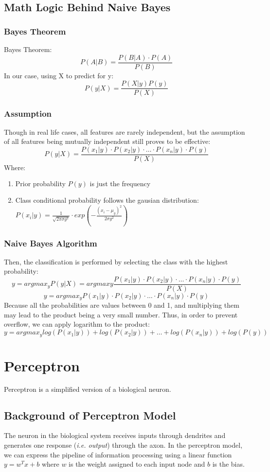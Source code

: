 \documentclass[12pt]{article}
\begin{document}
\subsection{Math Logic Behind Naive Bayes}
\subsubsection{Bayes Theorem}
Bayes Theorem:
$$P(A|B) = \frac{P(B|A)\cdot P(A)}{P(B)}$$
In our case, using X to predict for y:
$$P(y|X) = \frac{P(X|y)P(y)}{P(X)}$$
\subsubsection{Assumption}
Though in real life cases, all features are rarely independent, but the assumption of all features being mutually independent still proves to be effective:
$$P(y|X) = \frac{P(x_1|y)\cdot P(x_2|y)\cdot \dots \cdot P(x_n|y)\cdot P(y)}{P(X)}$$
Where:
\begin{enumerate}
	\item Prior probability $P(y)$ is just the frequency
	\item Class conditional probability follows the gausian distribution: $P(x_i|y) = \frac{1}{\sqrt{2\pi \sigma  y^2}}\cdot
exp(-\frac{(x_i - \mu_y)^2}{2\sigma  y^2})$
\end{enumerate}
\subsubsection{Naive Bayes Algorithm}
Then, the classification is performed by selecting the class with the highest probability:
$$y = argmax_yP(y|X) = argmax  y\frac{P(x_1|y)\cdot P(x_2|y)\cdot \dots \cdot P(x_n|y)\cdot P(y)}{P(X)}$$
$$y = argmax_yP(x_1|y)\cdot P(x_2|y)\cdot \dots \cdot P(x_n|y)\cdot P(y)$$
Because all the probabilities are values between 0 and 1, and multiplying them may lead to the product being a very small number. Thus, in order to prevent overflow, we can apply logarithm to the product:
$$y = argmax_ylog(P(x_1|y)) + log(P(x_2|y)) + \dots + log(P(x_n|y)) + log(P(y))$$
\newpage

\section{Perceptron}
Perceptron is a simplified version of a biological neuron.

\subsection{Background of Perceptron Model}
The neuron in the biological system receives inputs through dendrites and generates one response (\textit{i.e. output}) through the axon. In the perceptron model, we can express the pipeline of information processing using a linear function $y = w^Tx + b$ where $w$ is the weight assigned to each input node and $b$ is the bias. 
\end{document}
